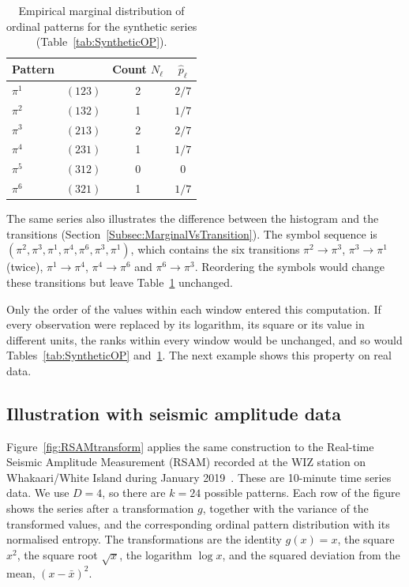 \begin{table}[H]
	\centering
	\begin{tabular}{lccc}
		\toprule
		Pattern & & Count $N_\ell$ & $\widehat{p}_\ell$ \\
		\midrule
		$\pi^1$ & $(123)$ & 2 & $2/7$ \\
		$\pi^2$ & $(132)$ & 1 & $1/7$ \\
		$\pi^3$ & $(213)$ & 2 & $2/7$ \\
		$\pi^4$ & $(231)$ & 1 & $1/7$ \\
		$\pi^5$ & $(312)$ & 0 & $0$ \\
		$\pi^6$ & $(321)$ & 1 & $1/7$ \\
		\bottomrule
	\end{tabular}
	\caption{Empirical marginal distribution of ordinal patterns for the synthetic series (Table~\ref{tab:SyntheticOP}).}
	\label{tab:SyntheticP}
\end{table}

The same series also illustrates the difference between the histogram and the transitions (Section~\ref{Subsec:MarginalVsTransition}). The symbol sequence is $(\pi^2,\pi^3,\pi^1,\pi^4,\pi^6,\pi^3,\pi^1)$, which contains the six transitions $\pi^2\to\pi^3$, $\pi^3\to\pi^1$ (twice), $\pi^1\to\pi^4$, $\pi^4\to\pi^6$ and $\pi^6\to\pi^3$. Reordering the symbols would change these transitions but leave Table~\ref{tab:SyntheticP} unchanged.

Only the order of the values within each window entered this computation. If every observation were replaced by its logarithm, its square or its value in different units, the ranks within every window would be unchanged, and so would Tables~\ref{tab:SyntheticOP} and~\ref{tab:SyntheticP}. The next example shows this property on real data.

\subsection{Illustration with seismic amplitude data}\label{Subsec:RSAMExample}

Figure~\ref{fig:RSAMtransform} applies the same construction to the Real-time Seismic Amplitude Measurement (RSAM) recorded at the WIZ station on Whakaari/White Island during January 2019~\cite{GeoNetRSAM}. These are 10-minute time series data. We use $D=4$, so there are $k=24$ possible patterns. Each row of the figure shows the series after a transformation $g$, together with the variance of the transformed values, and the corresponding ordinal pattern distribution with its normalised entropy. The transformations are the identity $g(x)=x$, the square $x^2$, the square root $\sqrt{x}$, the logarithm $\log x$, and the squared deviation from the mean, $(x-\bar{x})^2$.

